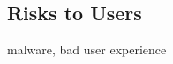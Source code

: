 \subsection{Risks to Users} \label{subsection:foundation-piracy-users}
malware, bad user experience\newline

